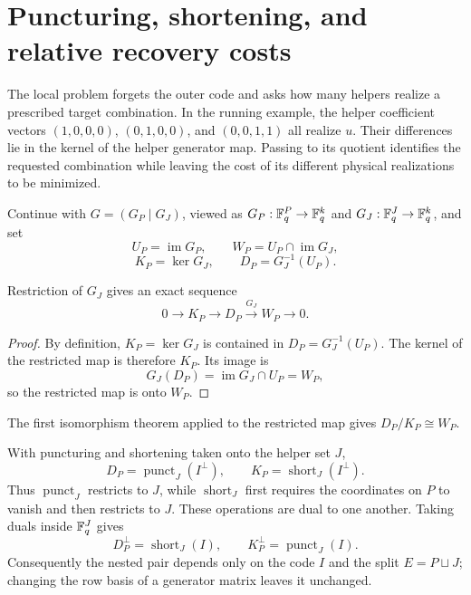\section{Puncturing, shortening, and relative recovery costs}
\label{sec:relative-weights}

The local problem forgets the outer code and asks how many helpers realize
a prescribed target combination.  In the running example, the helper
coefficient vectors $(1,0,0,0)$, $(0,1,0,0)$, and $(0,0,1,1)$ all realize
$u$.  Their differences lie in the kernel of the helper generator map.
Passing to its quotient identifies the requested combination while leaving
the cost of its different physical realizations to be minimized.

Continue with $G=(G_P\mid G_J)$, viewed as
$G_P:\mathbb F_q^P\to\mathbb F_q^k$ and $G_J:\mathbb F_q^J\to\mathbb F_q^k$, and set
\[
 U_P=\operatorname{im}G_P,
 \qquad
 W_P=U_P\cap\operatorname{im}G_J,
\]
\[
 K_P=\ker G_J,
 \qquad
 D_P=G_J^{-1}(U_P).
\]
\begin{proposition}
\label{prop:associated-pair}
%
%
Restriction of $G_J$ gives an exact sequence
\begin{equation}
 0\longrightarrow K_P\longrightarrow D_P
 \xrightarrow{G_J}W_P\longrightarrow0.
 \label{eq:associated-exact-sequence}
\end{equation}
\end{proposition}

\begin{proof}
By definition, $K_P=\ker G_J$ is contained in
$D_P=G_J^{-1}(U_P)$.  The kernel of the restricted map is therefore $K_P$.
Its image is
\[
 G_J(D_P)=\operatorname{im}G_J\cap U_P=W_P,
\]
so the restricted map is onto $W_P$.
%
\end{proof}

The first isomorphism theorem applied to the restricted map gives
$D_P/K_P\cong W_P$.

\begin{proposition}
\label{prop:puncture-shorten-pair}
%
With puncturing and shortening taken onto the helper set $J$,
\begin{equation}
 D_P=\operatorname{punct}_J(I^\perp),
 \qquad
 K_P=\operatorname{short}_J(I^\perp).
 \label{eq:puncture-shorten-pair}
\end{equation}
Thus $\operatorname{punct}_J$ restricts to $J$, while
$\operatorname{short}_J$ first requires the coordinates on $P$ to vanish and
then restricts to $J$.  These operations are dual to one another.  Taking
duals inside $\mathbb F_q^J$ gives
\begin{equation}
 D_P^\perp=\operatorname{short}_J(I),
 \qquad
 K_P^\perp=\operatorname{punct}_J(I).
 \label{eq:dual-puncture-shorten-pair}
\end{equation}
Consequently the nested pair depends only on the code $I$ and the split
$E=P\sqcup J$; changing the row basis of a generator matrix leaves it
unchanged.
\end{proposition}

